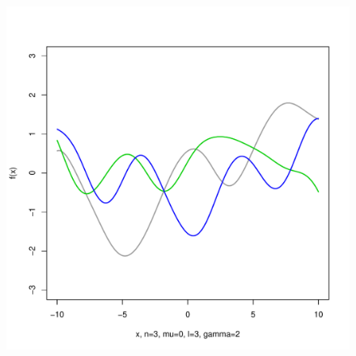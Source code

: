 \documentclass[12pt,letterpaper]{article}
\begin{document}
\begin{figure}
\begin{center}
\includegraphics[scale=0.2]{hw321/n3-m0-l3-g4.pdf}
\end{center}
\end{figure}
\end{document}
